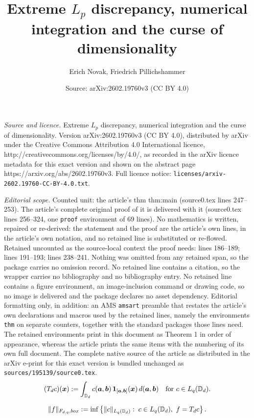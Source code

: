 \documentclass[10pt,a4paper]{amsart}
\title{Extreme $L_p$ discrepancy, numerical integration and the curse of dimensionality}
\author{Erich Novak, Friedrich Pillichshammer}
\date{Source: arXiv:2602.19760v3 (CC BY 4.0)}
\newcommand{\D}{\mathbb{D}}
\newcommand{\bsa}{{\boldsymbol a}}
\newcommand{\bsb}{{\boldsymbol b}}
\newcommand{\bsx}{{\boldsymbol x}}
\newcommand{\bx}{{\rm box}}
\newcommand{\rd}{\,{\rm d}}
\begin{document}
\maketitle

\noindent\emph{Source and licence.} Extreme $L_p$ discrepancy, numerical integration and the curse of dimensionality. Version arXiv:2602.19760v3 (CC BY 4.0), distributed by arXiv under the Creative Commons Attribution 4.0 International licence, http://creativecommons.org/licenses/by/4.0/, as recorded in the arXiv licence metadata for this exact version and shown on the abstract page https://arxiv.org/abs/2602.19760v3. Full licence notice: \texttt{licenses/arxiv-2602.19760-CC-BY-4.0.txt}.\par\smallskip

\noindent\textit{Editorial scope.} Counted unit: the article's thm thm:main (source0.tex lines 247--253). The article's complete original proof of it is delivered with it (source0.tex lines 256--324, one \texttt{proof} environment of 69 lines). No mathematics is written, repaired or re-derived: the statement and the proof are the article's own lines, in the article's own notation, and no retained line is substituted or re-flowed.  Retained uncounted as the source-local context the proof needs: lines 186--189; lines 191--193; lines 238--241.  Nothing was omitted from any retained span, so the package carries no omission record.  No retained line contains a citation, so the wrapper carries no bibliography and no bibliography entry.  No retained line contains a figure environment, an image-inclusion command or drawing code, so no image is delivered and the package declares no asset dependency.  Editorial formatting only, in addition: an AMS \texttt{amsart} preamble that restates the article's own declarations and macros used by the retained lines, namely the environments \texttt{thm} on separate counters, together with the standard packages those lines need.  The retained environments print in this document as Theorem 1 in order of appearance, whereas the article prints the same items with the numbering of its own full document.  The complete native source of the article as distributed in the arXiv e-print for this exact version is bundled unchanged as \texttt{sources/195139/source0.tex}.
\begin{equation}\label{eq:rep}
(T_d c)(\bsx):=\int_{\D_d} c(\bsa,\bsb)\, {\bf 1}_{[\bsa,\bsb]}(\bsx) \rd (\bsa,\bsb)
\quad\text{for }c\in L_q(\D_d).
\end{equation}

\begin{equation}\label{eq:norm-rep}
\|f\|_{F_{d,q},\bx}:=\inf\left\{\|c\|_{L_q(\D_d)}:\;c\in L_q(\D_d), \ f=T_dc\right\}.
\end{equation}
\end{document}
